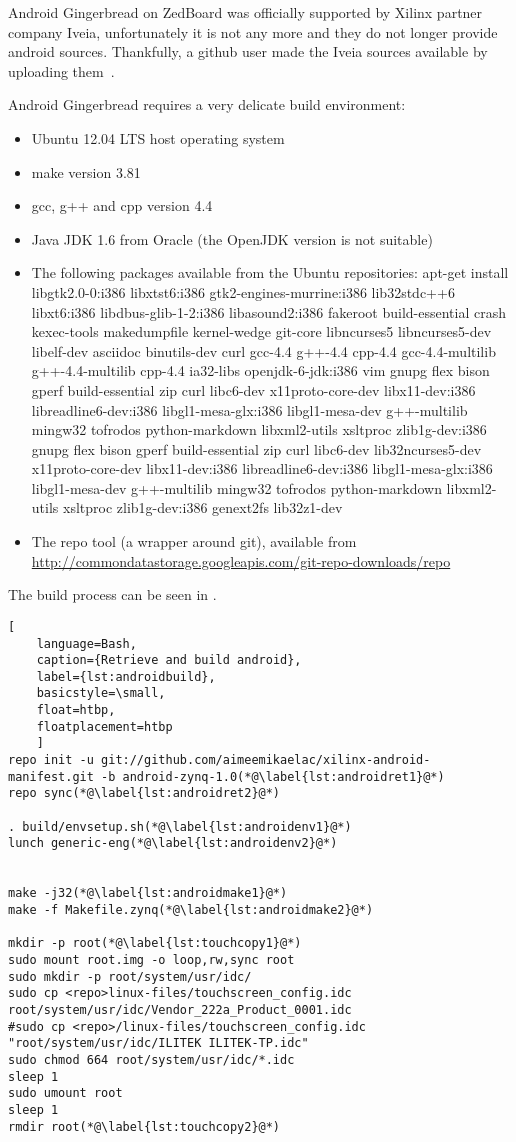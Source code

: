 Android Gingerbread on ZedBoard was officially supported by Xilinx partner
company Iveia, unfortunately it is not any more and they do not longer provide
android sources. Thankfully, a github user made the Iveia sources available by
uploading them~\cite{androidsource}.

Android Gingerbread requires a very delicate build environment:
\begin{itemize}
	\item Ubuntu 12.04 LTS host operating system
	\item make version 3.81
	\item gcc, g++ and cpp version 4.4
	\item Java JDK 1.6 from Oracle (the OpenJDK version is not suitable)
	\item The following packages available from the Ubuntu repositories:
		apt-get install libgtk2.0-0:i386 libxtst6:i386 gtk2-engines-murrine:i386
		lib32stdc++6 libxt6:i386 libdbus-glib-1-2:i386 libasound2:i386 fakeroot
		build-essential crash kexec-tools makedumpfile kernel-wedge git-core
		libncurses5 libncurses5-dev libelf-dev asciidoc binutils-dev curl
		gcc-4.4 g++-4.4 cpp-4.4 gcc-4.4-multilib g++-4.4-multilib cpp-4.4
		ia32-libs openjdk-6-jdk:i386 vim gnupg flex bison gperf build-essential
		zip curl libc6-dev x11proto-core-dev libx11-dev:i386
		libreadline6-dev:i386 libgl1-mesa-glx:i386 libgl1-mesa-dev g++-multilib
		mingw32 tofrodos python-markdown libxml2-utils xsltproc zlib1g-dev:i386
		gnupg flex bison gperf build-essential zip curl libc6-dev
		lib32ncurses5-dev x11proto-core-dev libx11-dev:i386
		libreadline6-dev:i386 libgl1-mesa-glx:i386 libgl1-mesa-dev
		g++-multilib mingw32 tofrodos python-markdown libxml2-utils xsltproc
		zlib1g-dev:i386 genext2fs lib32z1-dev
	\item The repo tool (a wrapper around git), available from\\
		\url{http://commondatastorage.googleapis.com/git-repo-downloads/repo}
\end{itemize}
The build process can be seen in .
\begin{lstlisting}[
	language=Bash,
	caption={Retrieve and build android},
	label={lst:androidbuild},
	basicstyle=\small,
	float=htbp,
	floatplacement=htbp
	]
repo init -u git://github.com/aimeemikaelac/xilinx-android-manifest.git -b android-zynq-1.0(*@\label{lst:androidret1}@*)
repo sync(*@\label{lst:androidret2}@*)

. build/envsetup.sh(*@\label{lst:androidenv1}@*)
lunch generic-eng(*@\label{lst:androidenv2}@*)


make -j32(*@\label{lst:androidmake1}@*)
make -f Makefile.zynq(*@\label{lst:androidmake2}@*)

mkdir -p root(*@\label{lst:touchcopy1}@*)
sudo mount root.img -o loop,rw,sync root
sudo mkdir -p root/system/usr/idc/
sudo cp <repo>linux-files/touchscreen_config.idc root/system/usr/idc/Vendor_222a_Product_0001.idc
#sudo cp <repo>/linux-files/touchscreen_config.idc "root/system/usr/idc/ILITEK ILITEK-TP.idc"
sudo chmod 664 root/system/usr/idc/*.idc
sleep 1
sudo umount root
sleep 1
rmdir root(*@\label{lst:touchcopy2}@*)
\end{lstlisting}
